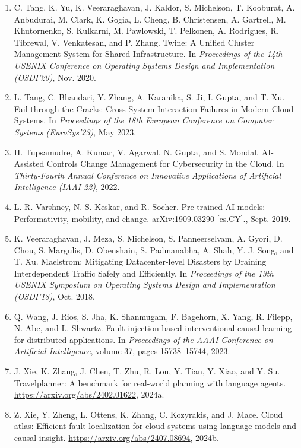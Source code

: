 \documentclass[10pt,UTF8,fontset=fandol]{ctexart}
\begin{document}
\begin{enumerate}[leftmargin=2em,itemsep=2pt]
\item C. Tang, K. Yu, K. Veeraraghavan, J. Kaldor, S. Michelson, T. Kooburat, A. Anbudurai, M. Clark, K. Gogia, L. Cheng, B. Christensen, A. Gartrell, M. Khutornenko, S. Kulkarni, M. Pawlowski, T. Pelkonen, A. Rodrigues, R. Tibrewal, V. Venkatesan, and P. Zhang. Twine: A Unified Cluster Management System for Shared Infrastructure. In \textit{Proceedings of the 14th USENIX Conference on Operating Systems Design and Implementation (OSDI'20)}, Nov. 2020.

\item L. Tang, C. Bhandari, Y. Zhang, A. Karanika, S. Ji, I. Gupta, and T. Xu. Fail through the Cracks: Cross-System Interaction Failures in Modern Cloud Systems. In \textit{Proceedings of the 18th European Conference on Computer Systems (EuroSys'23)}, May 2023.

\item H. Tupsamudre, A. Kumar, V. Agarwal, N. Gupta, and S. Mondal. AI-Assisted Controls Change Management for Cybersecurity in the Cloud. In \textit{Thirty-Fourth Annual Conference on Innovative Applications of Artificial Intelligence (IAAI-22)}, 2022.

\item L. R. Varshney, N. S. Keskar, and R. Socher. Pre-trained AI models: Performativity, mobility, and change. arXiv:1909.03290 [cs.CY]., Sept. 2019.

\item K. Veeraraghavan, J. Meza, S. Michelson, S. Panneerselvam, A. Gyori, D. Chou, S. Margulis, D. Obenshain, S. Padmanabha, A. Shah, Y. J. Song, and T. Xu. Maelstrom: Mitigating Datacenter-level Disasters by Draining Interdependent Traffic Safely and Efficiently. In \textit{Proceedings of the 13th USENIX Symposium on Operating Systems Design and Implementation (OSDI'18)}, Oct. 2018.

\item Q. Wang, J. Rios, S. Jha, K. Shanmugam, F. Bagehorn, X. Yang, R. Filepp, N. Abe, and L. Shwartz. Fault injection based interventional causal learning for distributed applications. In \textit{Proceedings of the AAAI Conference on Artificial Intelligence}, volume 37, pages 15738--15744, 2023.

\item J. Xie, K. Zhang, J. Chen, T. Zhu, R. Lou, Y. Tian, Y. Xiao, and Y. Su. Travelplanner: A benchmark for real-world planning with language agents. \url{https://arxiv.org/abs/2402.01622}, 2024a.

\item Z. Xie, Y. Zheng, L. Ottens, K. Zhang, C. Kozyrakis, and J. Mace. Cloud atlas: Efficient fault localization for cloud systems using language models and causal insight. \url{https://arxiv.org/abs/2407.08694}, 2024b.


\end{enumerate}
\end{document}

